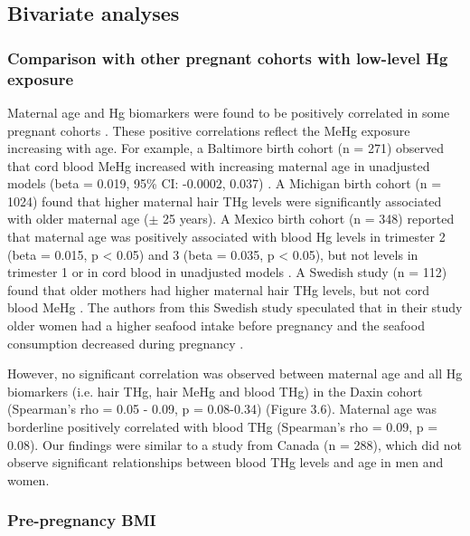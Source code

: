 \subsection{Bivariate analyses}

\subsubsection {Comparison with other pregnant cohorts with low-level Hg exposure}

Maternal age and Hg biomarkers were found to be positively correlated in some pregnant cohorts \citep{bjornberg2003methyl,xue2007maternal,basu2014mercury,wells2016cord}. These positive correlations reflect the MeHg exposure increasing with age. For example, a Baltimore birth cohort (n = 271) observed that cord blood MeHg increased with increasing maternal age in unadjusted models (beta = 0.019, 95\% CI: -0.0002, 0.037) \citep{wells2016cord}. A Michigan birth cohort (n = 1024) found that higher maternal hair THg levels were significantly associated with older maternal age (${\pm}$ 25 years)\citep{xue2007maternal}. A Mexico birth cohort (n = 348) reported that maternal age was positively associated with blood Hg levels in trimester 2 (beta = 0.015, p < 0.05) and 3 (beta = 0.035, p < 0.05), but not levels in trimester 1 or in cord blood in unadjusted models \citep{basu2014mercury}. A Swedish study (n = 112) found that older mothers had higher maternal hair THg levels, but not cord blood MeHg \citep{bjornberg2003methyl}. The authors from this Swedish study speculated that in their study older women had a higher seafood intake before pregnancy and the seafood consumption decreased during pregnancy \citep{bjornberg2003methyl}.

However, no significant correlation was observed between maternal age and all Hg biomarkers (i.e. hair THg, hair MeHg and blood THg) in the Daxin cohort (Spearman's rho = 0.05 - 0.09, p = 0.08-0.34) (Figure 3.6). Maternal age was borderline positively correlated with blood THg (Spearman's rho = 0.09, p = 0.08). Our findings were similar to a study from Canada \citep{mahaffey1998blood} (n = 288), which did not observe significant relationships between blood THg levels and age in men and women.

\subsubsection{Pre-pregnancy BMI}

